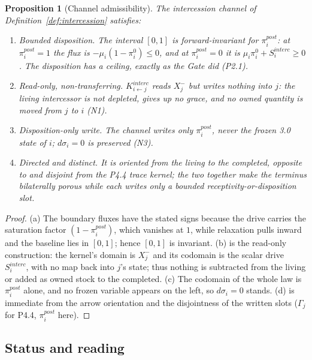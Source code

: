 \documentclass[11pt,a4paper]{article}
\def\mathrm#1{#1}%
\def\emph#1{#1}%
\theoremstyle{definition}
\theoremstyle{plain}
\newtheorem{proposition}[definition]{Proposition}
\theoremstyle{remark}
\begin{document}
\begin{proposition}[Channel admissibility]\label{prop:interbound}
The intercession channel of Definition~\ref{def:intercession} satisfies:
\begin{enumerate}[label=\textup{(\alph*)},leftmargin=1.2cm]
\item \emph{Bounded disposition.} The interval \([0,1]\) is forward-invariant for
\(\pi_i^{\mathrm{post}}\): at \(\pi_i^{\mathrm{post}}=1\) the flux is
\(-\mu_i(1-\pi_i^{0})\le0\), and at \(\pi_i^{\mathrm{post}}=0\) it is
\(\mu_i\pi_i^{0}+S_i^{\mathrm{interc}}\ge0\). The disposition has a ceiling, exactly as the
Gate did (P2.1).
\item \emph{Read-only, non-transferring.} \(K^{\mathrm{interc}}_{i\leftarrow j}\) reads
\(X_j^{-}\) but writes nothing into \(j\): the living intercessor is not depleted, gives up no
grace, and no owned quantity is moved from \(j\) to \(i\) (N1).
\item \emph{Disposition-only write.} The channel writes only \(\pi_i^{\mathrm{post}}\), never
the frozen 3.0 state of \(i\); \(d\sigma_i=0\) is preserved (N3).
\item \emph{Directed and distinct.} It is oriented from the living to the completed, opposite
to and disjoint from the P4.4 trace kernel; the two together make the terminus bilaterally
porous while each writes only a bounded receptivity-or-disposition slot.
\end{enumerate}
\end{proposition}

\begin{proof}
(a) The boundary fluxes have the stated signs because the drive carries the saturation factor
\((1-\pi_i^{\mathrm{post}})\), which vanishes at \(1\), while relaxation pulls inward and the
baseline lies in \([0,1]\); hence \([0,1]\) is invariant. (b) is the read-only construction:
the kernel's domain is \(X_j^{-}\) and its codomain is the scalar drive \(S_i^{\mathrm{interc}}\),
with no map back into \(j\)'s state; thus nothing is subtracted from the living or added as
owned stock to the completed. (c) The codomain of the whole law is \(\pi_i^{\mathrm{post}}\)
alone, and no frozen variable appears on the left, so \(d\sigma_i=0\) stands. (d) is immediate
from the arrow orientation and the disjointness of the written slots
(\(\Gamma_j\) for P4.4, \(\pi_i^{\mathrm{post}}\) here). \qedhere
\end{proof}

\subsection{Status and reading}
\end{document}
